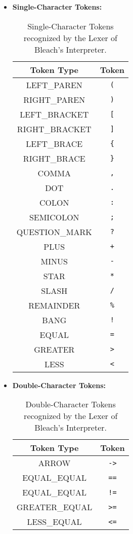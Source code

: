 \begin{itemize}
    \item \textbf{Single-Character Tokens:}
    \begin{table}[H]
    \centering
        \begin{tabular}{|c|c|}
        \hline
        \textbf{Token Type} & \textbf{Token} \\ \hline
        LEFT\_PAREN & \texttt{(} \\ \hline
        RIGHT\_PAREN & \texttt{)} \\ \hline
        LEFT\_BRACKET & \texttt{[} \\ \hline
        RIGHT\_BRACKET & \texttt{]} \\ \hline
        LEFT\_BRACE & \texttt{\{} \\ \hline
        RIGHT\_BRACE & \texttt{\}} \\ \hline
        COMMA & \texttt{,} \\ \hline
        DOT & \texttt{.} \\ \hline
        COLON & \texttt{:} \\ \hline
        SEMICOLON & \texttt{;} \\ \hline
        QUESTION\_MARK & \texttt{?} \\ \hline
        PLUS & \texttt{+} \\ \hline
        MINUS & \texttt{-} \\ \hline
        STAR & \texttt{*} \\ \hline
        SLASH & \texttt{/} \\ \hline
        REMAINDER & \texttt{\%} \\ \hline
        BANG & \texttt{!} \\ \hline
        EQUAL & \texttt{=} \\ \hline
        GREATER & \texttt{>} \\ \hline
        LESS & \texttt{<} \\ \hline
        \end{tabular}
        \caption{Single-Character Tokens recognized by the Lexer of Bleach's Interpreter.}
    \end{table}

    \item \textbf{Double-Character Tokens:}
    \begin{table}[H]
    \centering
        \begin{tabular}{|c|c|}
        \hline
        \textbf{Token Type} & \textbf{Token} \\ \hline
        ARROW & \texttt{->} \\ \hline
        EQUAL\_EQUAL & \texttt{==} \\ \hline
        EQUAL\_EQUAL & \texttt{!=} \\ \hline
        GREATER\_EQUAL & \texttt{>=} \\ \hline
        LESS\_EQUAL & \texttt{<=} \\ \hline        
        \end{tabular}
        \caption{Double-Character Tokens recognized by the Lexer of Bleach's Interpreter.}
    \end{table}


\end{itemize}
